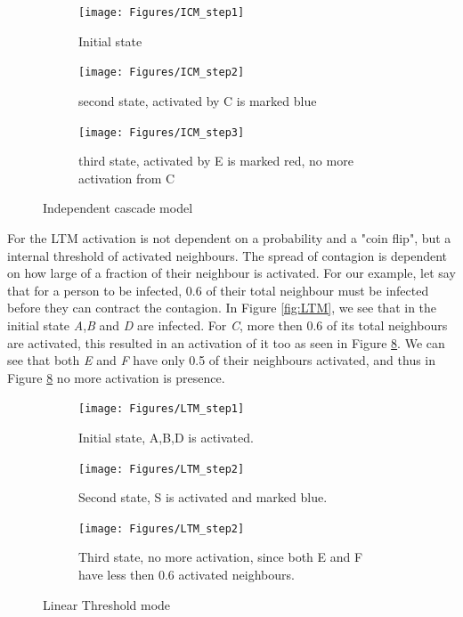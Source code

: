 
\begin{figure}[!ht]
	\begin{subfigure}{0.3\textwidth}
		\texttt{[image: Figures/ICM\_step1]}
		\caption{Initial state} 
		\label{fig:ICM}
	\end{subfigure}
	\begin{subfigure}{0.3\textwidth}
		\texttt{[image: Figures/ICM\_step2]}
		\caption{second state, activated by C is marked blue} 
		\label{fig:ICM2}
	\end{subfigure}
	\begin{subfigure}{0.3\textwidth}
		\texttt{[image: Figures/ICM\_step3]}
		\caption{third state, activated by E is marked red, no more activation from C} 
		\label{fig:ICM3}
	\end{subfigure}
	\caption{Independent cascade model}
	\label{fig:ICM_step}
\end{figure}


For the LTM activation is not dependent on a probability and a "coin flip", but a internal threshold of activated neighbours. The spread of contagion is dependent on how large of a fraction of their neighbour is activated. For our example, let say that for a person to be infected, 0.6 of their total neighbour must be infected before they can contract the contagion. In Figure \ref{fig:LTM}, we see that in the initial state \textit{A},\textit{B} and \textit{D} are infected. For \textit{C}, more then 0.6 of its total neighbours are activated, this resulted in an activation of it too as seen in Figure \ref{fig:linearThresh3}.  We can see that both \textit{E} and \textit{F} have only 0.5 of their neighbours activated, and thus in Figure \ref{fig:linearThresh3} no more activation is presence.


\begin{figure}[!ht] \label{fig:LTM}
	\begin{subfigure}{0.3\textwidth}
		\texttt{[image: Figures/LTM\_step1]}
		\caption{Initial state, A,B,D is activated.} 
		\label{fig:linearThresh}
	\end{subfigure}
	\begin{subfigure}{0.3\textwidth}
		\texttt{[image: Figures/LTM\_step2]}
		\caption{Second state, S is activated and marked blue.} 
		\label{fig:linearThresh2}
	\end{subfigure}
	\begin{subfigure}{0.3\textwidth}
		\texttt{[image: Figures/LTM\_step2]}
		\caption{Third state, no more activation, since both E and F have less then 0.6 activated neighbours.} 
		\label{fig:linearThresh3}
	\end{subfigure}
	\caption{Linear Threshold mode}
\end{figure}


